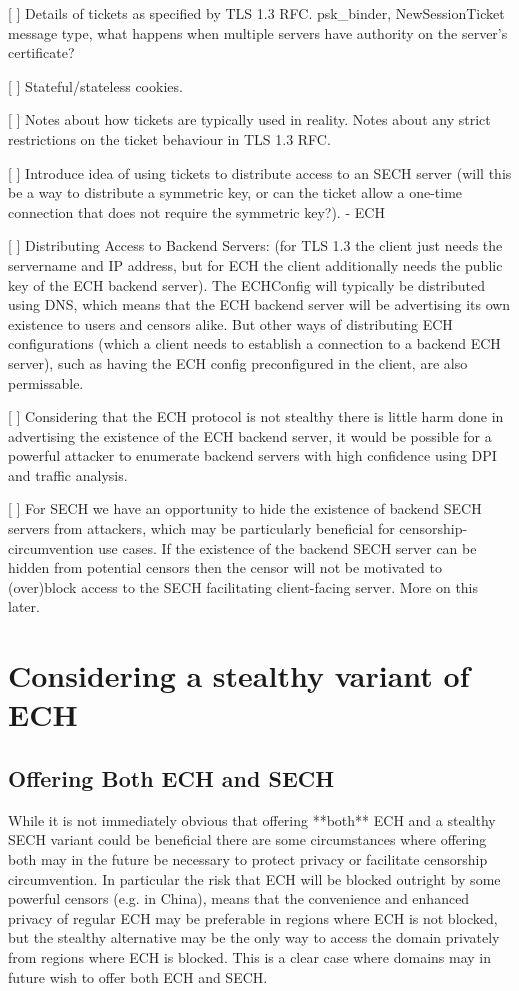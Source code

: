 [ ] Details of tickets as specified by TLS 1.3 RFC. psk_binder, NewSessionTicket message type, what happens when multiple servers have authority on the server's certificate?

[ ] Stateful/stateless cookies.

[ ] Notes about how tickets are typically used in reality. Notes about any strict restrictions on the ticket behaviour in TLS 1.3 RFC.

[ ] Introduce idea of using tickets to distribute access to an SECH server (will this be a way to distribute a symmetric key, or can the ticket allow a one-time connection that does not require the symmetric key?).
      - ECH

[ ] Distributing Access to Backend Servers: (for TLS 1.3 the client just needs the servername and IP address, but for ECH the client additionally needs the public key of the ECH backend server). The ECHConfig will typically be distributed using DNS, which means that the ECH backend server will be advertising its own existence to users and censors alike. But other ways of distributing ECH configurations (which a client needs to establish a connection to a backend ECH server), such as having the ECH config preconfigured in the client, are also permissable.

[ ] Considering that the ECH protocol is not stealthy there is little harm done in advertising the existence of the ECH backend server, it would be possible for a powerful attacker to enumerate backend servers with high confidence using DPI and traffic analysis.

[ ] For SECH we have an opportunity to hide the existence of backend SECH servers from attackers, which may be particularly beneficial for censorship-circumvention use cases. If the existence of the backend SECH server can be hidden from potential censors then the censor will not be motivated to (over)block access to the SECH facilitating client-facing server. More on this later.

\section{Considering a stealthy variant of ECH}
\subsection{Offering Both ECH and SECH}
While it is not immediately obvious that offering **both** ECH and a stealthy SECH variant could be beneficial there are some circumstances where offering both may in the future be necessary to protect privacy or facilitate censorship circumvention. In particular the risk that ECH will be blocked outright by some powerful censors (e.g. in China), means that the convenience and enhanced privacy of regular ECH may be preferable in regions where ECH is not blocked, but the stealthy alternative may be the only way to access the domain privately from regions where ECH is blocked. This is a clear case where domains may in future wish to offer both ECH and SECH.

